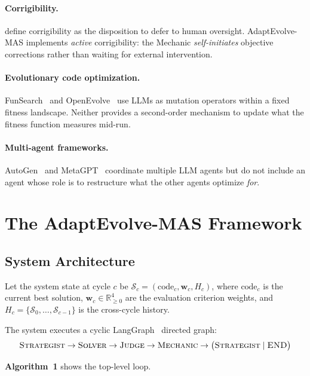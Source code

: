 \documentclass[letterpaper]{article}
\begin{document}
\paragraph{Corrigibility.}
\citet{soares2015} define corrigibility as the disposition to defer to
human oversight.  AdaptEvolve-MAS implements \emph{active} corrigibility:
the Mechanic \emph{self-initiates} objective corrections rather than
waiting for external intervention.

\paragraph{Evolutionary code optimization.}
FunSearch~\cite{funSearch2023} and OpenEvolve~\cite{openEvolve2024} use
LLMs as mutation operators within a fixed fitness landscape.  Neither
provides a second-order mechanism to update what the fitness function
measures mid-run.

\paragraph{Multi-agent frameworks.}
AutoGen~\cite{wu2023} and MetaGPT~\cite{hong2023} coordinate multiple
LLM agents but do not include an agent whose role is to restructure
what the other agents optimize \emph{for}.

\section{The AdaptEvolve-MAS Framework}

\subsection{System Architecture}

Let the system state at cycle $c$ be
$\mathcal{S}_c = (\text{code}_c, \mathbf{w}_c, H_c)$,
where $\text{code}_c$ is the current best solution,
$\mathbf{w}_c \in \mathbb{R}^4_{\geq 0}$ are the evaluation
criterion weights, and $H_c = \{\mathcal{S}_0, \ldots, \mathcal{S}_{c-1}\}$
is the cross-cycle history.

The system executes a cyclic LangGraph~\cite{langgraph} directed graph:
\[
  \textsc{Strategist} \to \textsc{Solver} \to \textsc{Judge} \to
  \textsc{Mechanic} \to \bigl(\textsc{Strategist} \mid \textsc{END}\bigr)
\]

\noindent\textbf{Algorithm~1} shows the top-level loop.
\end{document}

